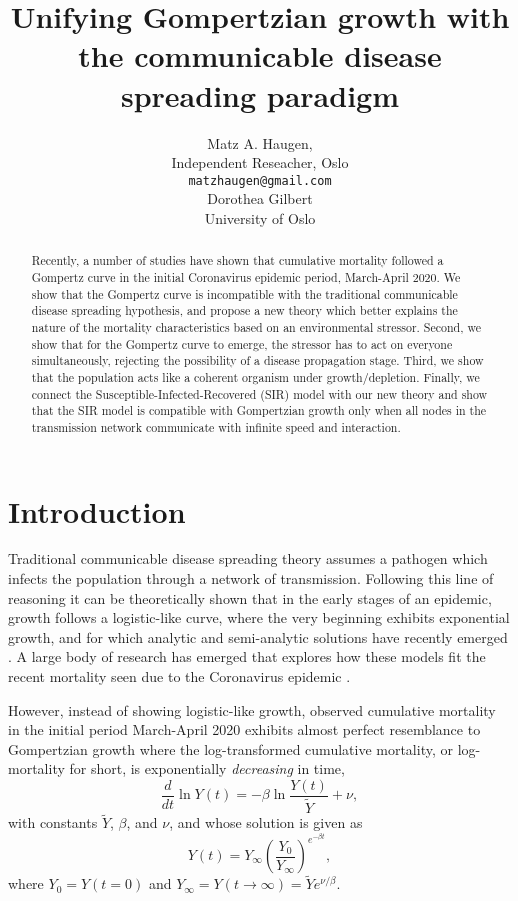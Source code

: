 \documentclass{article}
\title{Unifying Gompertzian growth with the communicable disease spreading paradigm}
\author{Matz A. Haugen, \\
Independent Reseacher, Oslo\\
\texttt{matzhaugen@gmail.com} \\
  \And
  Dorothea Gilbert \\
  University of Oslo\\
}
\begin{document}
\maketitle

\begin{abstract}
Recently, a number of studies have shown that cumulative mortality followed a Gompertz curve in the initial Coronavirus epidemic period, March-April 2020. 
We show that the Gompertz curve is incompatible with the traditional communicable disease spreading hypothesis, and propose a new theory which better explains the nature of the mortality characteristics based on an environmental stressor. 
Second, we show that for the Gompertz curve to emerge, the stressor has to act on everyone simultaneously, rejecting the possibility of a disease propagation stage. 
Third, we show that the population acts like a coherent organism under growth/depletion. 
Finally, we connect the Susceptible-Infected-Recovered (SIR) model with our new theory and show that the SIR model is compatible with Gompertzian growth only when all nodes in the transmission network communicate with infinite speed and interaction.
\end{abstract}


\section{Introduction}
Traditional communicable disease spreading theory assumes a pathogen which infects the population through a network of transmission. 
Following this line of reasoning it can be theoretically shown that in the early stages of an epidemic, growth follows a logistic-like curve, where the very beginning exhibits exponential growth, and for which analytic and semi-analytic solutions have recently emerged \citep{harko2014exact,kroger2020analytical,schlickeiser2021analytical,heng2020approximately}. 
A large body of research has emerged that explores how these models fit the recent mortality seen due to the Coronavirus epidemic \citep{carletti2020covid,cooper2020sir,postnikov2020estimation,munoz2021sir,cooper2022dynamical,saikia2021covid}. 

However, instead of showing logistic-like growth, observed cumulative mortality in the initial period March-April 2020 exhibits almost perfect resemblance to Gompertzian growth \citep{Gompertz1825,bajzer1997mathematical} where the log-transformed cumulative mortality, or log-mortality for short, is exponentially \emph{decreasing} in time,
\begin{equation}
\label{eq:GompertzODE}
\frac{d}{dt}\ln{Y(t)} = -\beta\ln{\frac{Y(t)}{\tilde{Y}}} + \nu,
\end{equation} 
with constants $\tilde{Y}$, $\beta$, and $\nu$, and whose solution is given as
\begin{equation}
\label{eq:gomp_solution}
Y(t) = Y_\infty \left(\frac{Y_0}{Y_\infty}\right)^{e^{-\beta t}},
\end{equation}
where $Y_{0}=Y(t = 0)$ and $Y_{\infty}=Y(t\rightarrow \infty)=\tilde{Y}e^{\nu/\beta}$. 
\end{document}
